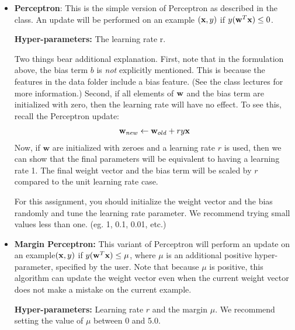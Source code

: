 \begin{itemize}
\item \textbf{Perceptron}: This is the simple version of Perceptron as
  described in the class. An update will be performed on an example
  $({\bf x}, y)$ if $y({\bf w}^T {\bf x})\leq 0$.

  \textbf{Hyper-parameters:} The learning rate r.

  Two things bear additional explanation. First, note that in the
  formulation above, the bias term $b$ is {\em not} explicitly
  mentioned. This is because the features in the data folder include a
  bias feature. (See the class lectures for more information.) Second,
  if all elements of ${\bf w}$ and the bias term are initialized with
  zero, then the learning rate will have no effect. To see this,
  recall the Perceptron update:
  \begin{align*} 
    {\bf w}_{new} \leftarrow {\bf w}_{old} + ry\textbf{x}
  \end{align*}
  Now, if $\textbf{w}$ are initialized with zeroes and a learning rate
  $r$ is used, then we can show that the final parameters will be
  equivalent to having a learning rate 1. The final weight vector and
  the bias term will be scaled by $r$ compared to the unit learning
  rate case.

  For this assignment, you should initialize the weight vector and the
  bias randomly and tune the learning rate parameter. We recommend
  trying small values less than one. (eg. 1, 0.1, 0.01, etc.)

\item \textbf{Margin Perceptron:} This variant of Perceptron will
  perform an update on an example$({\bf x}, y)$ if $y({\bf w}^T {\bf x})\leq \mu$,
  where $\mu$ is an additional positive hyper-parameter, specified by
  the user. Note that because $\mu$ is positive, this algorithm can
  update the weight vector even when the current weight vector does
  not make a mistake on the current example.

  \textbf{Hyper-parameters:} Learning rate $r$ and the margin $\mu$.
  We recommend setting the value of $\mu$ between 0 and 5.0.

\end{itemize}


